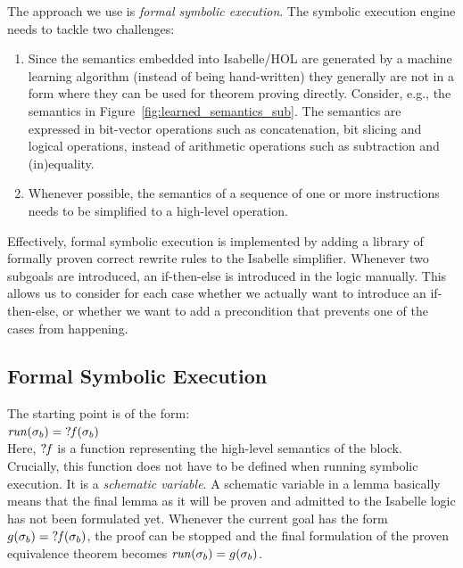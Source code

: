 The approach we use is \emph{formal symbolic execution}.
The symbolic execution engine needs to tackle two challenges:
\begin{enumerate}
\item Since the semantics embedded into Isabelle/HOL are generated by a machine learning algorithm (instead of being hand-written) they generally are not in a form where they can be used for theorem proving directly.
Consider, e.g., the semantics in Figure~\ref{fig:learned_semantics_sub}.
The semantics are expressed in bit-vector operations such as concatenation, bit slicing and logical operations, instead of arithmetic operations such as subtraction and (in)equality.
\item Whenever possible, the semantics of a sequence of one or more instructions needs to be simplified to a high-level operation.
\end{enumerate}
Effectively, formal symbolic execution is implemented by adding a library of formally proven correct rewrite rules to the Isabelle simplifier.
Whenever two subgoals are introduced, an if-then-else is introduced in the logic manually. 
This allows us to consider for each case whether we actually want to introduce an if-then-else, or whether we want to add a precondition that prevents one of the cases from happening.

\subsection{Formal Symbolic Execution}

The starting point is of the form:
\\[1em]
	\mbox{\hspace{5ex}} $\mathit{run}(\sigma_b) = \mathit{?f}(\sigma_b)$
\\[1em]
Here, $\mathit{?f}$ is a function representing the high-level semantics of the block.
Crucially, this function does not have to be defined when running symbolic execution.
It is a \emph{schematic  variable}.
A schematic variable in a lemma basically means that the final lemma as it will be proven and admitted to the Isabelle logic has not been formulated yet.
Whenever the current goal has the form $g(\sigma_b) = \mathit{?f}(\sigma_b)$, the proof can be stopped and the final formulation of the proven equivalence theorem becomes $\mathit{run}(\sigma_b) = g(\sigma_b)$.

